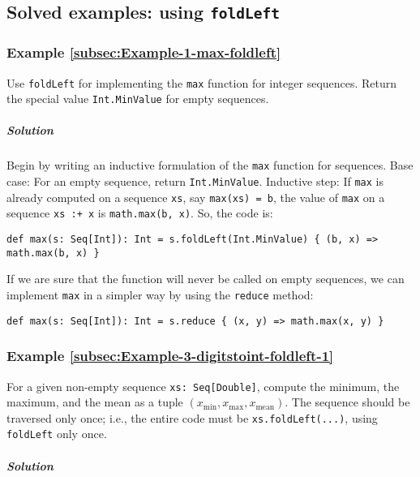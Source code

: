 \subsection{Solved examples: using \texttt{foldLeft}}

\subsubsection{Example \label{subsec:Example-1-max-foldleft}\ref{subsec:Example-1-max-foldleft}}

Use \lstinline!foldLeft! for implementing the \lstinline!max! function
for integer sequences. Return the special value \lstinline!Int.MinValue!
for empty sequences.

\subparagraph{Solution}

Begin by writing an inductive formulation of the \lstinline!max!
function for sequences. Base case: For an empty sequence, return \lstinline!Int.MinValue!.
Inductive step: If \lstinline!max! is already computed on a sequence
\lstinline!xs!, say \lstinline!max(xs) = b!, the value of \lstinline!max!
on a sequence \lstinline!xs :+ x! is \lstinline!math.max(b, x)!.
So, the code is:

\begin{lstlisting}
def max(s: Seq[Int]): Int = s.foldLeft(Int.MinValue) { (b, x) => math.max(b, x) }
\end{lstlisting}
If we are sure that the function will never be called on empty sequences,
we can implement \lstinline!max! in a simpler way by using the \lstinline!reduce!
method:
\begin{lstlisting}
def max(s: Seq[Int]): Int = s.reduce { (x, y) => math.max(x, y) }
\end{lstlisting}


\subsubsection{Example \label{subsec:Example-3-digitstoint-foldleft-1}\ref{subsec:Example-3-digitstoint-foldleft-1}}

For a given non-empty sequence \lstinline!xs: Seq[Double]!, compute
the minimum, the maximum, and the mean as a tuple $\left(x_{\min},x_{\max},x_{\text{mean}}\right)$.
The sequence should be traversed only once; i.e., the entire code
must be \lstinline!xs.foldLeft(...)!, using \lstinline!foldLeft!
only once.

\subparagraph{Solution}

